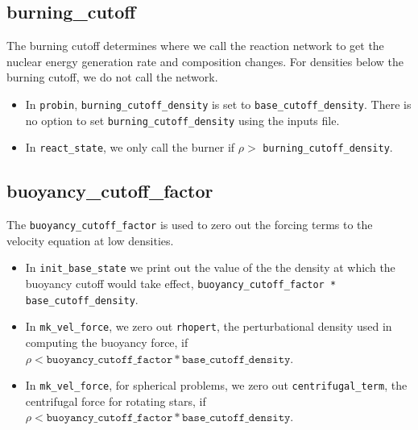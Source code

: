 \subsection{burning\_cutoff}

The burning cutoff determines where we call the reaction network to
get the nuclear energy generation rate and composition changes.  For
densities below the burning cutoff, we do not call the network.

\begin{itemize}

\item In {\tt probin}, {\tt burning\_cutoff\_density} is set to 
  {\tt base\_cutoff\_density}.  There is no option to set 
  {\tt burning\_cutoff\_density} using the inputs file.

\item In {\tt react\_state}, we only call the burner if 
  $\rho >$ {\tt burning\_cutoff\_density}.


\end{itemize}


\subsection{buoyancy\_cutoff\_factor}

The {\tt buoyancy\_cutoff\_factor} is used to zero out the forcing terms
to the velocity equation at low densities.

\begin{itemize}

\item In {\tt init\_base\_state} we print out the value of the
   the density at which the buoyancy cutoff would take effect,
   {\tt buoyancy\_cutoff\_factor * base\_cutoff\_density}.

\item In {\tt mk\_vel\_force}, we zero out {\tt rhopert}, the
   perturbational density used in computing the buoyancy force,
   if $\rho < \mathtt{buoyancy\_cutoff\_factor * base\_cutoff\_density}$.

\item In {\tt mk\_vel\_force}, for spherical problems, we 
   zero out {\tt centrifugal\_term}, the centrifugal force for
   rotating stars, if $\rho < \mathtt{buoyancy\_cutoff\_factor *
   base\_cutoff\_density}$.

\end{itemize}





